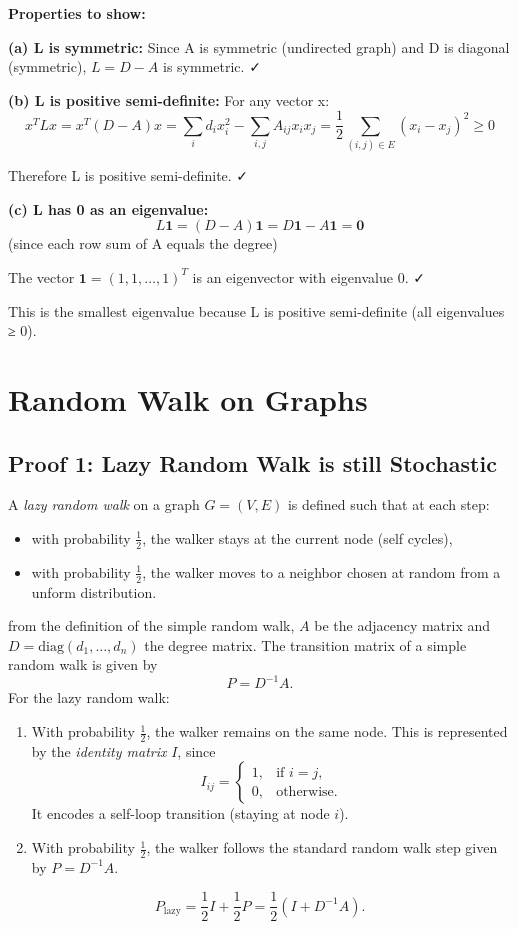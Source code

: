 \documentclass[12pt,a4paper]{article}
\begin{document}
\textbf{Properties to show:}

\textbf{(a) L is symmetric:}
Since A is symmetric (undirected graph) and D is diagonal (symmetric), $L = D - A$ is symmetric. ✓

\textbf{(b) L is positive semi-definite:}
For any vector x:
$$x^TLx = x^T(D-A)x = \sum_i d_i x_i^2 - \sum_{i,j} A_{ij} x_i x_j = \frac{1}{2}\sum_{(i,j) \in E} (x_i - x_j)^2 \geq 0$$

Therefore L is positive semi-definite. ✓

\textbf{(c) L has 0 as an eigenvalue:}
$$L\mathbf{1} = (D-A)\mathbf{1} = D\mathbf{1} - A\mathbf{1} = \mathbf{0}$$ (since each row sum of A equals the degree)

The vector $\mathbf{1} = (1,1,\ldots,1)^T$ is an eigenvector with eigenvalue 0. ✓

This is the smallest eigenvalue because L is positive semi-definite (all eigenvalues ≥ 0).
\section{Random Walk on Graphs}
\subsection{Proof 1: Lazy Random Walk is still Stochastic}

A \emph{lazy random walk} on a graph \( G = (V, E) \) is defined such that at each step:
\begin{itemize}
    \item with probability \( \frac{1}{2} \), the walker stays at the current node (self cycles),
    \item with probability \( \frac{1}{2} \), the walker moves to a neighbor chosen at random from a unform distribution.
\end{itemize}

from the definition of the simple random walk, \( A \) be the adjacency matrix and \( D = \mathrm{diag}(d_1, \dots, d_n) \) the degree matrix.  
The transition matrix of a simple random walk is given by
\[
P = D^{-1}A.
\]
For the lazy random walk:
\begin{enumerate}
    \item With probability \( \tfrac{1}{2} \), the walker remains on the same node.
    This is represented by the \emph{identity matrix} \( I \), since
    \[
    I_{ij} =
    \begin{cases}
    1, & \text{if } i = j,\\[4pt]
    0, & \text{otherwise.}
    \end{cases}
    \]
    It encodes a self-loop transition (staying at node \( i \)).
    \item With probability \( \tfrac{1}{2} \), the walker follows the standard random walk step given by \( P = D^{-1}A \).
\end{enumerate}
\[
P_{\text{lazy}} = \frac{1}{2}I + \frac{1}{2}P = \frac{1}{2}\left(I + D^{-1}A\right).
\]
\end{document}
